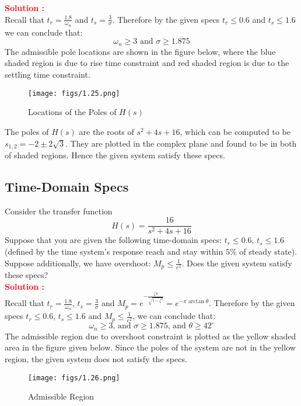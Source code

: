\documentclass[12pt]{article}
\begin{document}
\noindent 
\textbf{\textcolor{red}{Solution :}} \\
Recall that $t_r=\frac{1.8}{\omega_n}$ and $t_s=\frac{3}{\sigma}$.
Therefore by the given specs $t_r \leq 0.6$ and $t_s \leq 1.6$  we can conclude that:
\[
\omega_n \geq 3 \text{  and  } \sigma \geq 1.875
\]
The admissible pole locations are shown in the figure below, where the blue shaded region is due to rise time constraint and red shaded region is due to the settling time constraint.

\begin{figure}[h!]
    \centering
    \texttt{[image: figs/1.25.png]}
        \caption{Locations of the Poles of \(H(s)\)}
    \label{fig:prb42}
\end{figure}
\noindent The poles of $H(s)$ are the roots of $s^2 + 4s + 16$, which can be computed to be $s_{1,2} = -2 \pm 2 \sqrt{3}$. They are plotted in the complex plane and found to be in both of shaded regions. Hence the given system satisfy these specs.

\clearpage
\subsection{Time-Domain Specs}
Consider the transfer function 
\[
H(s)=\frac{16}{s^2+4s+16}
\]
Suppose that you are given the following time-domain specs: $t_r \leq 0.6$, $t_s \leq 1.6$ (defined by the time system's response reach and stay within $5\%$ of steady state). Suppose additionally, we have overshoot: $M_p \leq \frac{1}{e^2}$. Does the given system satisfy these specs? \\
\textbf{\textcolor{red}{Solution :}} \\
Recall that $t_r=\frac{1.8}{\omega_n}$, $t_s=\frac{3}{\sigma}$ and $M_p =e^{-\frac{\zeta \pi}{\sqrt{1-\zeta^2}}}=e^{-\pi \arctan \theta}$. Therefore by the given specs $t_r \leq 0.6$, $t_s \leq 1.6$ and  $M_p \leq \frac{1}{e^2}$, we can conclude that:
\[
\omega_n \geq 3 \text{, and  } \sigma \geq 1.875 \text{, and  }  \theta \geq 42^\circ
\]
The admissible region due to overshoot constraint is plotted as the yellow shaded area in the figure given below. Since the poles of the system are not in the yellow region, the given system does not satisfy the specs.
\begin{figure}[H]
    \centering
    \texttt{[image: figs/1.26.png]}
    \caption{Admissible Region}
    \label{fig:prb43}
\end{figure}

\clearpage
\end{document}
